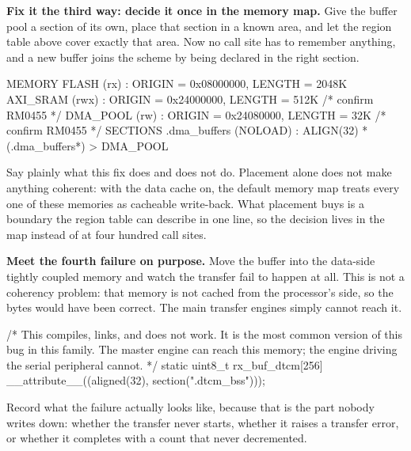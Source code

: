 \begin{steps}
\item \textbf{Fix it the third way: decide it once in the memory map.} Give the
buffer pool a section of its own, place that section in a known area, and let
the region table above cover exactly that area. Now no call site has to
remember anything, and a new buffer joins the scheme by being declared in the
right section.
\begin{ldcode}
MEMORY
{
  FLASH      (rx)  : ORIGIN = 0x08000000, LENGTH = 2048K
  AXI_SRAM   (rwx) : ORIGIN = 0x24000000, LENGTH = 512K   /* confirm RM0455 */
  DMA_POOL   (rw)  : ORIGIN = 0x24080000, LENGTH = 32K    /* confirm RM0455 */
}
SECTIONS
{
  .dma_buffers (NOLOAD) : ALIGN(32) { *(.dma_buffers*) } > DMA_POOL
}
\end{ldcode}
Say plainly what this fix does and does not do. Placement alone does not make
anything coherent: with the data cache on, the default memory map treats every
one of these memories as cacheable write-back. What placement buys is a
boundary the region table can describe in one line, so the decision lives in
the map instead of at four hundred call sites.

\item \textbf{Meet the fourth failure on purpose.} Move the buffer into the
data-side tightly coupled memory and watch the transfer fail to happen at all.
This is not a coherency problem: that memory is not cached from the processor's
side, so the bytes would have been correct. The main transfer engines simply
cannot reach it.
\begin{ccode}
/* This compiles, links, and does not work. It is the most common version
   of this bug in this family. The master engine can reach this memory;
   the engine driving the serial peripheral cannot. */
static uint8_t rx_buf_dtcm[256] __attribute__((aligned(32),
                                               section(".dtcm_bss")));
\end{ccode}
Record what the failure actually looks like, because that is the part nobody
writes down: whether the transfer never starts, whether it raises a transfer
error, or whether it completes with a count that never decremented.


\end{steps}
